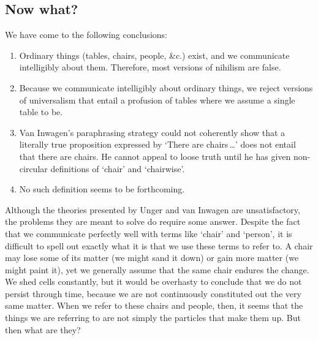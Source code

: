 \documentclass[11pt]{article}
\begin{document}
\begin{spacing}{1}
\section{Now what?}
We have come to the following conclusions:
\begin{enumerate}
	\item Ordinary things (tables, chairs, people, \&c.) exist,
          and we communicate intelligibly about them.  Therefore, most
          versions of nihilism are false.
	\item Because we communicate intelligibly about ordinary
          things, we reject versions of universalism that entail a
          profusion of tables where we assume a single table to be.
	\item Van Inwagen's paraphrasing strategy could not coherently
          show that a literally true proposition expressed by `There
          are chairs\,\ldots ' does not entail that there are chairs.
          He cannot appeal to loose truth until he has given
          non-circular definitions of `chair' and `chairwise'.
	\item No such definition seems to be forthcoming.
\end{enumerate}

Although the theories presented by Unger and van Inwagen are
unsatisfactory, the problems they are meant to solve do require some
answer.  Despite the fact that we communicate perfectly well with
terms like `chair' and `person', it is difficult to spell out exactly
what it is that we use these terms to refer to.  A chair may lose some
of its matter (we might sand it down) or gain more matter (we might
paint it), yet we generally assume that the same chair endures the
change.  We shed cells constantly, but it would be overhasty to
conclude that we do not persist through time, because we are not
continuously constituted out the very same matter.  When we refer to
these chairs and people, then, it seems that the things we are
referring to are not simply the particles that make them up.  But then
what are they?

\end{spacing}
\end{document}
